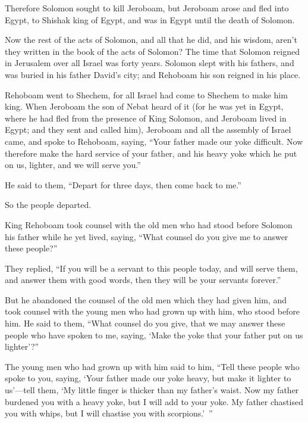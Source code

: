 \myverse{}Therefore Solomon sought to kill Jeroboam, but Jeroboam arose
and fled into Egypt, to Shishak king of Egypt, and was in Egypt until the death of Solomon.

\myverse{}Now the rest of the acts of Solomon, and all that he did, and
his wisdom, aren’t they written in the book of the acts of Solomon?
\myverse{}The time that Solomon reigned in Jerusalem over all Israel was forty years.
\myverse{}Solomon slept with his fathers, and was buried in his father David’s city;
and Rehoboam his son reigned in his place.


\mychapter{} \myverse*{}Rehoboam went to Shechem, for all Israel had come to Shechem to
make him king.
\myverse{}When Jeroboam the son of Nebat heard of it (for he was yet in Egypt, where
he had fled from the presence of King Solomon, and Jeroboam lived in Egypt;
\myverse{}and they sent and called him), Jeroboam and all the assembly of Israel came,
and spoke to Rehoboam, saying,
\myverse{}“Your father made our yoke difficult. Now therefore make the hard service of
your father, and his heavy yoke which he put on us, lighter, and we will serve you.”

\myverse{}He said to them, “Depart for three days, then come back to me.”

So the people departed.

\myverse{}King Rehoboam took counsel with the old men who had stood before
Solomon his father while he yet lived, saying, “What counsel do you give me to answer these people?”

\myverse{}They replied, “If you will be a servant to this people today,
and will serve them, and answer them with good words, then they will be your servants forever.”

\myverse{}But he abandoned the counsel of the old men which they had given
him, and took counsel with the young men who had grown up with him, who stood before him.
\myverse{}He said to them, “What counsel do you give, that we may answer these people
who have spoken to me, saying, ‘Make the yoke that your father put on us lighter’?”

\myverse{}The young men who had grown up with him said to him, “Tell these
people who spoke to you, saying, ‘Your father made our yoke heavy, but make it lighter to us’—tell them,
‘My little finger is thicker than my father’s waist.
\myverse{}Now my father burdened you with a heavy yoke, but I will add to your yoke.
My father chastised you with whips, but I will chastise you with scorpions.’ ”

